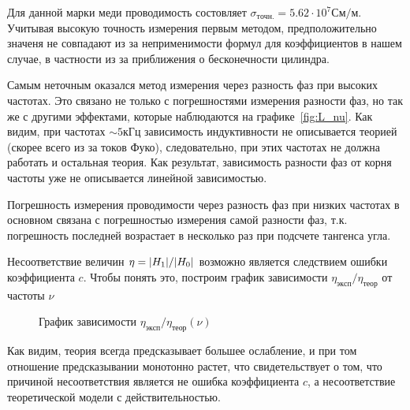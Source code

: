 \documentclass{article}
\begin{document}
Для данной марки меди проводимость состовляет $\sigma_{точн.} = 5.62\cdot10^{7} См/м$.
Учитывая высокую точность измерения первым методом, предположительно значеня не совпадают
из за неприменимости формул для коэффициентов в нашем случае, в частности из за
приближения о бесконечности цилиндра.

Самым неточным оказался метод измерения через разность фаз при высоких частотах. Это
связано не только с погрешностями измерения разности фаз, но так же с другими эффектами,
которые наблюдаются на графике~\ref{fig:L_nu}. Как видим, при частотах $\sim 5кГц$
зависимость индуктивности не описывается теорией (скорее всего из за токов
Фуко), следовательно, при этих частотах не должна работать и остальная теория.
Как результат, зависимость разности фаз от корня частоты уже не описывается линейной
зависимостью.

Погрешность измерения проводимости через разность фаз при низких частотах в основном
связана с погрешностью измерения самой разности фаз, т.к. погрешность последней
возрастает в несколько раз при подсчете тангенса угла.

Несоответствие величин $\eta = \abs{H_1}/\abs{H_0}$ возможно является следствием ошибки
коэффициента $c$. Чтобы понять это, построим график зависимости $\eta_{эксп}/\eta_{теор}$
от частоты $\nu$

\begin{figure}[h]
    \caption{График зависимости $\eta_{эксп}/\eta_{теор} (\nu)$}
    \label{fig:reduction_ratio}
    \newpage
\end{figure}

Как видим, теория всегда предсказывает большее ослабление, и при том отношение
предсказывании монотонно растет, что свидетельствует о том, что причиной несоответствия
является не ошибка коэффициента $c$, а несоответствие теоретической модели с
действительностью.
\end{document}
